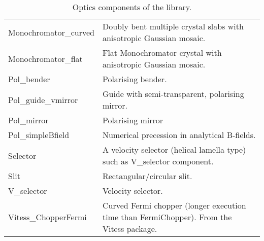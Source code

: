 \begin{table}
\begin{center}
{\begin{tabular}{|p{}|p{}|}
 Monochromator\_curved & Doubly bent multiple crystal
                      slabs with anisotropic Gaussian mosaic. \\
 Monochromator\_flat &  Flat Monochromator crystal with
                      anisotropic Gaussian mosaic. \\
 Pol\_bender & Polarising bender. \\
 Pol\_guide\_vmirror & Guide with semi-transparent, polarising mirror. \\
 Pol\_mirror        & Polarising mirror \\
 Pol\_simpleBfield  & Numerical precession in analytical B-fields. \\
 Selector            & A velocity selector (helical lamella type) such as
                      V\_selector component. \\
 Slit                & Rectangular/circular
                      slit. \\
 V\_selector          & Velocity selector. \\
 Vitess\_ChopperFermi & Curved Fermi chopper (longer execution time than FermiChopper).
                     From the Vitess package.\\ \hline
    \end{tabular}
    \caption{Optics components of the \MCS library.}
    \label{t:comp-optics}
    }
  \end{center}
\end{table}

